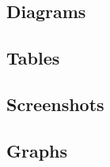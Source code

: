 \appendix

\chapter{}

\section{Diagrams}

\section{Tables}

\section{Screenshots}

\section{Graphs}